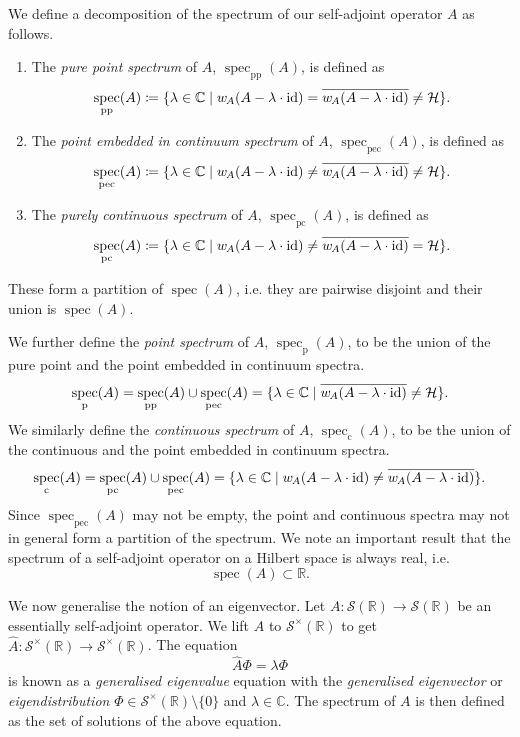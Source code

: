 \documentclass[12pt, a4 paper]{article}
\theoremstyle{definition}
\newcommand{\rr}{\mathbb{R}}
\newcommand{\cc}{\mathbb{C}}
\newcommand{\hilbert}{\mathcal{H}}
\newcommand{\schwartz}{\mathcal{S}}
\newcommand{\schwartzr}{\schwartz(\rr)}
\newcommand{\dist}{\schwartz^\times}
\newcommand{\distr}{\dist(\rr)}
\newcommand{\identity}{\mathrm{id}}
\newcommand{\w}{w\kern-1pt}
\DeclareMathOperator{\spec}{spec}
\begin{document}
	We define a decomposition of the spectrum of our self-adjoint operator $A$ as follows.
	\begin{enumerate}
		\item The \textit{pure point spectrum} of $A$, $\spec_\text{pp}(A)$, is defined as
		\[
		\spec_\text{pp}(A) \coloneq \{\lambda \in \cc \mid \w_A(A - \lambda \cdot \identity) = \overline{\w_A(A - \lambda \cdot \identity)} \neq \hilbert\}.
		\]
		\item The \textit{point embedded in continuum spectrum} of $A$, $\spec_\text{pec}(A)$, is defined as
		\[
		\spec_\text{pec}(A) \coloneq \{\lambda \in \cc \mid \w_A(A - \lambda \cdot \identity) \neq \overline{\w_A(A - \lambda \cdot \identity)} \neq \hilbert\}.
		\]
		\item The \textit{purely continuous spectrum} of $A$, $\spec_\text{pc}(A)$, is defined as
		\[
		\spec_\text{pc}(A) \coloneq \{\lambda \in \cc \mid \w_A(A - \lambda \cdot \identity) \neq \overline{\w_A(A - \lambda \cdot \identity)} = \hilbert\}.
		\]
	\end{enumerate}
	These form a partition of $\spec(A)$, i.e. they are pairwise disjoint and their union is $\spec(A)$.

	We further define the \textit{point spectrum} of $A$, $\spec_\mathrm{p}(A)$, to be the union of the pure point and the point embedded in continuum spectra.
	\[
	\spec_\mathrm{p}(A) =  \spec_\text{pp}(A) \cup \spec_\text{pec}(A) = \{\lambda \in \cc \mid\overline{\w_A(A - \lambda \cdot \identity)} \neq \hilbert\}.
	\]
	We similarly define the \textit{continuous spectrum} of $A$, $\spec_\text{c} (A)$, to be the union of the continuous and the point embedded in continuum spectra.
	\[
	\spec_\mathrm{c}(A) =  \spec_\text{pc}(A) \cup \spec_\text{pec}(A) = \{\lambda \in \cc \mid \w_A(A - \lambda \cdot \identity) \neq \overline{\w_A(A - \lambda \cdot \identity)}\}.
	\]
	Since $\spec_\text{pec}(A)$ may not be empty, the point and continuous spectra may not in general form a partition of the spectrum. We note an important result that the spectrum of a self-adjoint operator on a Hilbert space is always real, i.e.
	\[
	\spec(A) \subset \rr.
	\]

	We now generalise the notion of an eigenvector. Let $A \colon \schwartzr \rightarrow \schwartzr$ be an essentially self-adjoint operator. We lift $A$ to $\distr$ to get $\hat{A} \colon \distr \rightarrow \distr$. The equation
	\[
	\hat{A} \Phi = \lambda \Phi
	\]
	is known as a \textit{generalised eigenvalue} equation with the \textit{generalised eigenvector} or \textit{eigendistribution} $\Phi \in \distr \setminus \{0\}$ and $\lambda \in \cc$.
	The spectrum of $A$ is then defined as the set of solutions of the above equation.
\end{document}
